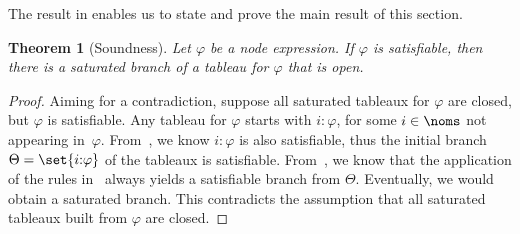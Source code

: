 \documentclass[10pt,a4paper]{amsart}
\newtheorem{thm}{Theorem}[section]
\theoremstyle{definition}
\theoremstyle{remark}
\begin{document}
The result in  enables us to state and prove the main result of this section.


\begin{thm}[Soundness]
    \label{thm:soundness}
    Let $\varphi$ be a node expression. If $\varphi$ is satisfiable, then there is a saturated branch of a tableau for $\varphi$ that is open.
\end{thm}



\begin{proof}
    Aiming for a contradiction, suppose all saturated tableaux for $\varphi$ are closed, but $\varphi$ is satisfiable. Any tableau for $\varphi$ starts with $i{:}\varphi$, for some $i\in\noms$ not appearing in~$\varphi$.
    From~, we know $i{:}{\varphi}$ is also satisfiable, thus the initial branch $\Theta=\set{i{:}\varphi}$ of the tableaux is satisfiable. 
    From~, we know that the application of the rules in~ always yields a satisfiable branch from $\Theta$.
    Eventually, we would obtain a saturated branch.
    This contradicts the assumption that all saturated tableaux built from $\varphi$ are closed.
\end{proof}





\end{document}
